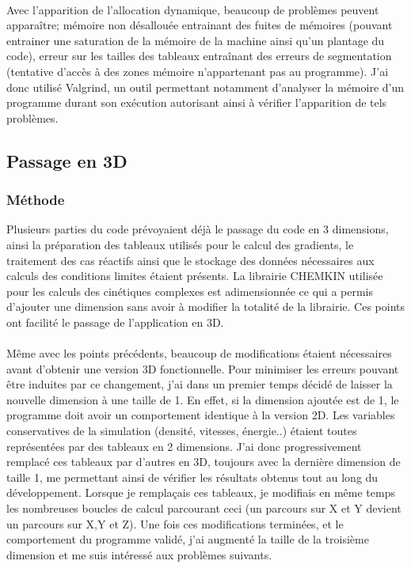 \paragraph{}Avec l'apparition de l'allocation dynamique, beaucoup de problèmes peuvent apparaître; mémoire non désallouée entrainant des fuites de mémoires (pouvant entrainer une saturation de la mémoire de la machine ainsi qu'un plantage du code), erreur sur les tailles des tableaux entraînant des erreurs de segmentation (tentative d'accès à des zones mémoire n'appartenant pas au programme).
J'ai donc utilisé Valgrind, un outil permettant notamment d'analyser la mémoire d'un programme durant son exécution autorisant ainsi à vérifier l'apparition de tels problèmes.




\subsection{Passage en 3D}

\subsubsection{Méthode}\label{sec:3dmeth}
Plusieurs parties du code prévoyaient déjà le passage du code en 3 dimensions, ainsi la préparation des tableaux utilisés pour le calcul des gradients, le traitement des cas réactifs ainsi que le stockage des données nécessaires aux calculs des conditions limites étaient présents. La librairie CHEMKIN utilisée pour les calculs des cinétiques complexes est adimensionnée ce qui a permis d'ajouter une dimension sans avoir à modifier la totalité de la librairie. Ces points ont facilité le passage de l'application en 3D.


\paragraph{}Même avec les points précédents, beaucoup de modifications étaient nécessaires avant d'obtenir une version 3D fonctionnelle. Pour minimiser les erreurs pouvant être induites par ce changement, j'ai dans un premier temps décidé de laisser la nouvelle dimension à une taille de 1. En effet, si la dimension ajoutée est de 1, le programme doit avoir un comportement identique à la version 2D. Les variables conservatives de la simulation (densité, vitesses, énergie..) étaient toutes représentées par des tableaux en 2 dimensions. J'ai donc progressivement remplacé ces tableaux par d'autres en 3D, toujours avec la dernière dimension de taille 1,  me permettant ainsi de vérifier les résultats obtenus tout au long du développement. Lorsque je remplaçais ces tableaux, je modifiais en même temps les nombreuses boucles de calcul parcourant ceci (un parcours sur X et Y devient un parcours sur X,Y et Z). Une fois ces modifications terminées, et le comportement du programme validé, j'ai augmenté la taille de la troisième dimension et me suis intéressé aux problèmes suivants.

